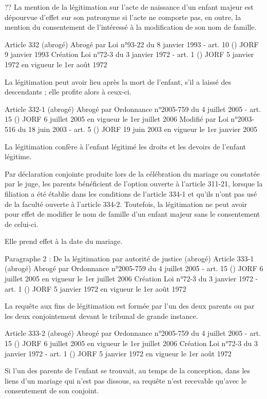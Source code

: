 \documentclass[
  12pt,
]{book}
\begin{document}
\begin{encadre}{??}
La mention de la légitimation sur l'acte de naissance d'un enfant majeur est dépourvue d'effet sur son patronyme si l'acte ne comporte pas, en outre, la mention du consentement de l'intéressé à la modification de son nom de famille.

Article 332 (abrogé)
Abrogé par Loi n°93-22 du 8 janvier 1993 - art. 10 () JORF 9 janvier 1993
Création Loi n°72-3 du 3 janvier 1972 - art. 1 () JORF 5 janvier 1972 en vigueur le 1er août 1972

La légitimation peut avoir lieu après la mort de l'enfant, s'il a laissé des descendants ; elle profite alors à ceux-ci.

Article 332-1 (abrogé)
Abrogé par Ordonnance n°2005-759 du 4 juillet 2005 - art. 15 () JORF 6 juillet 2005 en vigueur le 1er juillet 2006
Modifié par Loi n°2003-516 du 18 juin 2003 - art. 5 () JORF 19 juin 2003 en vigueur le 1er janvier 2005

La légitimation confère à l'enfant légitimé les droits et les devoirs de l'enfant légitime.

Par déclaration conjointe produite lors de la célébration du mariage ou constatée par le juge, les parents bénéficient de l'option ouverte à l'article 311-21, lorsque la filiation a été établie dans les conditions de l'article 334-1 et qu'ils n'ont pas usé de la faculté ouverte à l'article 334-2. Toutefois, la légitimation ne peut avoir pour effet de modifier le nom de famille d'un enfant majeur sans le consentement de celui-ci.

Elle prend effet à la date du mariage.

Paragraphe 2 : De la légitimation par autorité de justice (abrogé)
Article 333-1 (abrogé)
Abrogé par Ordonnance n°2005-759 du 4 juillet 2005 - art. 15 () JORF 6 juillet 2005 en vigueur le 1er juillet 2006
Création Loi n°72-3 du 3 janvier 1972 - art. 1 () JORF 5 janvier 1972 en vigueur le 1er août 1972

La requête aux fins de légitimation est formée par l'un des deux parents ou par les deux conjointement devant le tribunal de grande instance.

Article 333-2 (abrogé)
Abrogé par Ordonnance n°2005-759 du 4 juillet 2005 - art. 15 () JORF 6 juillet 2005 en vigueur le 1er juillet 2006
Création Loi n°72-3 du 3 janvier 1972 - art. 1 () JORF 5 janvier 1972 en vigueur le 1er août 1972

Si l'un des parents de l'enfant se trouvait, au temps de la conception, dans les liens d'un mariage qui n'est pas dissous, sa requête n'est recevable qu'avec le consentement de son conjoint.


\end{encadre}
\end{document}
